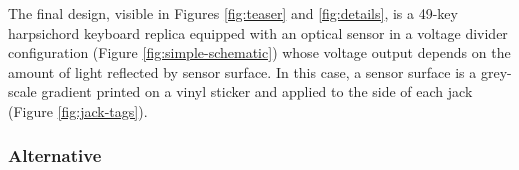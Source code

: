 
The final design, visible in Figures \ref{fig:teaser} and \ref{fig:details}, is a 49-key harpsichord keyboard replica equipped with an optical sensor in a voltage divider configuration (Figure \ref{fig:simple-schematic}) whose voltage output depends on the amount of light reflected by sensor surface. In this case, a sensor surface is a grey-scale gradient printed on a vinyl sticker and applied to the side of each jack (Figure \ref{fig:jack-tags}). 

    
\subsubsection{Alternative}
